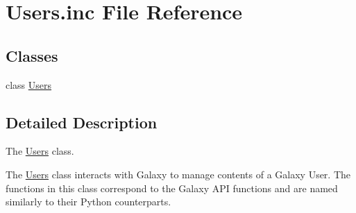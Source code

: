 \hypertarget{Users_8inc}{}\section{Users.\+inc File Reference}
\label{Users_8inc}
\subsection*{Classes}
\begin{DoxyCompactItemize}
\item 
class \hyperlink{classUsers}{Users}
\end{DoxyCompactItemize}


\subsection{Detailed Description}
The \hyperlink{classUsers}{Users} class.

The \hyperlink{classUsers}{Users} class interacts with Galaxy to manage contents of a Galaxy User. The functions in this class correspond to the Galaxy A\+PI functions and are named similarly to their Python counterparts. 